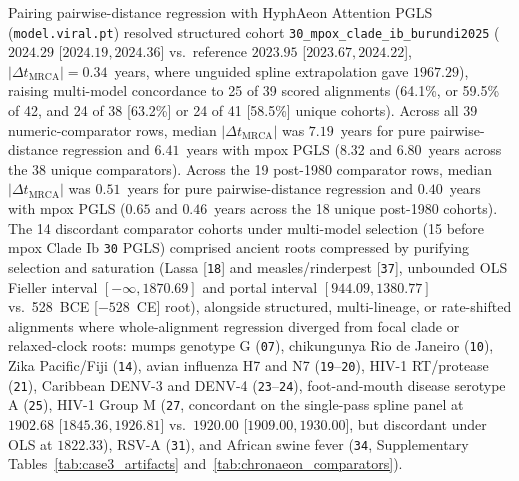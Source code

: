 \documentclass[11pt,letterpaper]{article}
\newcommand{\tool}[1]{\textsf{#1}}
\begin{document}
Pairing pairwise-distance regression with \tool{HyphAeon} Attention PGLS (\nolinkurl{model.viral.pt}) resolved structured cohort \nolinkurl{30_mpox_clade_ib_burundi2025} ($2024.29$ [$2024.19, 2024.36$] vs.\ reference $2023.95$ [$2023.67, 2024.22$], $|\Delta t_{\mathrm{MRCA}}| = 0.34$~years, where unguided spline extrapolation gave $1967.29$), raising multi-model concordance to 25 of 39 scored alignments (64.1\%, or 59.5\% of 42, and 24 of 38 [63.2\%] or 24 of 41 [58.5\%] unique cohorts). Across all 39 numeric-comparator rows, median $|\Delta t_{\mathrm{MRCA}}|$ was $7.19$~years for pure pairwise-distance regression and $6.41$~years with mpox PGLS ($8.32$ and $6.80$~years across the 38 unique comparators). Across the 19 post-1980 comparator rows, median $|\Delta t_{\mathrm{MRCA}}|$ was $0.51$~years for pure pairwise-distance regression and $0.40$~years with mpox PGLS ($0.65$ and $0.46$~years across the 18 unique post-1980 cohorts). The 14 discordant comparator cohorts under multi-model selection (15 before mpox Clade Ib \texttt{30} PGLS) comprised ancient roots compressed by purifying selection and saturation (Lassa \cite{andersen2015lassa, suchard2020lassa} [\texttt{18}] and measles/rinderpest \cite{dux2020measles} [\texttt{37}], unbounded OLS Fieller interval $[-\infty, 1870.69]$ \cite{fieller1954some} and portal interval $[944.09, 1380.77]$ vs.\ 528~BCE [$-528$~CE] root), alongside structured, multi-lineage, or rate-shifted alignments where whole-alignment regression diverged from focal clade or relaxed-clock roots: mumps genotype G (\texttt{07}), chikungunya Rio de Janeiro (\texttt{10}), Zika Pacific/Fiji (\texttt{14}), avian influenza H7 and N7 (\texttt{19}--\texttt{20}), HIV-1 RT/protease (\texttt{21}), Caribbean DENV-3 and DENV-4 (\texttt{23}--\texttt{24}), foot-and-mouth disease serotype A (\texttt{25}), HIV-1 Group M (\texttt{27}, concordant on the single-pass spline panel at $1902.68$ [$1845.36, 1926.81$] vs.\ $1920.00$ [$1909.00, 1930.00$], but discordant under OLS at $1822.33$), RSV-A (\texttt{31}), and African swine fever (\texttt{34}, Supplementary Tables~\ref{tab:case3_artifacts} and~\ref{tab:chronaeon_comparators}).
\end{document}
